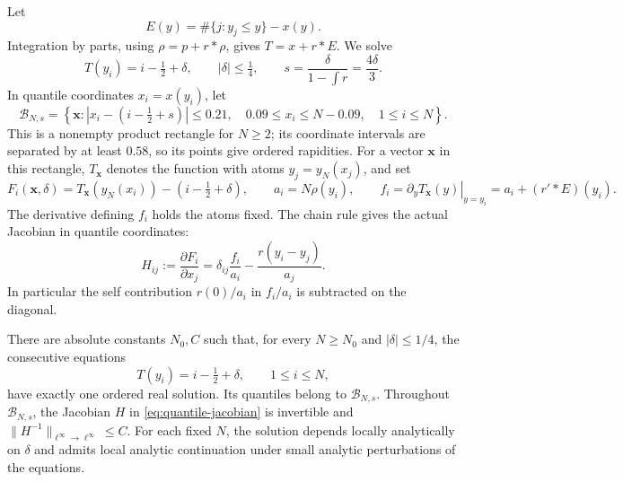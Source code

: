 Let
\[
 E(y)=\#\{j:y_j\le y\}-x(y).
\]
Integration by parts, using \(\rho=p+r*\rho\), gives \(T=x+r*E\). We solve
\[
 T(y_i)=i-\tfrac12+\delta,\qquad |\delta|\le\tfrac14,
 \qquad s=\frac{\delta}{1-\int r}=\frac{4\delta}{3}.
\]
In quantile coordinates \(x_i=x(y_i)\), let
\[
 \mathcal B_{N,s}=
 \left\{\boldsymbol x:
 |x_i-(i-\tfrac12+s)|\le0.21,\quad
 0.09\le x_i\le N-0.09,\quad 1\le i\le N\right\}.
\]
This is a nonempty product rectangle for \(N\ge2\); its coordinate intervals are separated by at least \(0.58\), so its points give ordered rapidities. For a vector \(\boldsymbol x\) in this rectangle, \(T_{\boldsymbol x}\) denotes the function with atoms \(y_j=y_N(x_j)\), and set
\[
 F_i(\boldsymbol x,\delta)=T_{\boldsymbol x}(y_N(x_i))
          -(i-\tfrac12+\delta),\qquad
 a_i=N\rho(y_i),\qquad
 f_i=\left.\partial_yT_{\boldsymbol x}(y)\right|_{y=y_i}
       =a_i+(r'*E)(y_i).
\]
The derivative defining \(f_i\) holds the atoms fixed. The chain rule gives the actual Jacobian in quantile coordinates:
\begin{equation}\label{eq:quantile-jacobian}
 H_{ij}:=\frac{\partial F_i}{\partial x_j}
 =\delta_{ij}\frac{f_i}{a_i}
       -\frac{r(y_i-y_j)}{a_j}.
\end{equation}
In particular the self contribution \(r(0)/a_i\) in \(f_i/a_i\) is subtracted on the diagonal.

\begin{proposition}\label{prop:real-counting}
There are absolute constants \(N_0,C\) such that, for every \(N\ge N_0\) and \(|\delta|\le1/4\), the consecutive equations
\[
 T(y_i)=i-\tfrac12+\delta,\qquad 1\le i\le N,
\]
have exactly one ordered real solution. Its quantiles belong to \(\mathcal B_{N,s}\). Throughout \(\mathcal B_{N,s}\), the Jacobian \(H\) in \eqref{eq:quantile-jacobian} is invertible and \(\|H^{-1}\|_{\ell^\infty\to\ell^\infty}\le C\). For each fixed \(N\), the solution depends locally analytically on \(\delta\) and admits local analytic continuation under small analytic perturbations of the equations.
\end{proposition}

